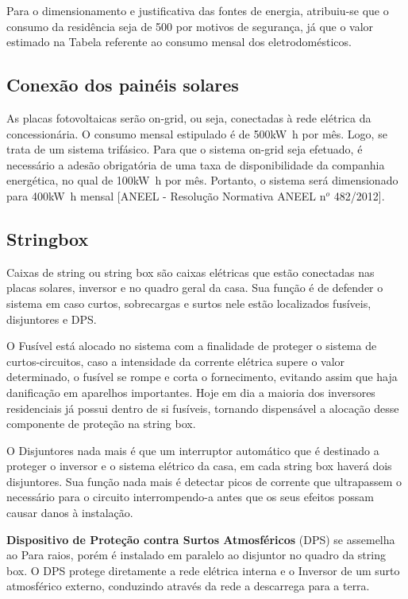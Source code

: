 	Para o dimensionamento e justificativa das fontes de energia, atribuiu-se que o consumo da residência seja de 500 por motivos de segurança, já que o valor estimado na Tabela referente ao consumo mensal dos eletrodomésticos.

\subsection{Conexão dos painéis solares}

	As placas fotovoltaicas serão on-grid, ou seja, conectadas à rede elétrica da concessionária. O consumo mensal estipulado é de 500\si{\kilo\watt\hour} por mês. Logo, se trata de um sistema trifásico. Para que o sistema on-grid seja efetuado, é necessário a adesão obrigatória de uma taxa de disponibilidade da companhia energética, no qual de 100\si{\kilo\watt\hour} por mês. Portanto, o sistema será dimensionado para 400\si{\kilo\watt\hour} mensal [ANEEL -  Resolução Normativa ANEEL n$^o$ 482/2012].

\subsection{Stringbox}
	
	Caixas de string ou string box são caixas elétricas que estão conectadas nas placas solares, inversor e no quadro geral da casa. Sua função é de defender o sistema em caso curtos, sobrecargas e surtos nele estão localizados fusíveis, disjuntores e DPS.

	O Fusível está alocado no sistema com a finalidade de proteger o sistema de curtos-circuitos, caso a intensidade da corrente elétrica supere o valor determinado, o fusível se rompe e corta o fornecimento, evitando assim que haja danificação em aparelhos importantes. Hoje em dia a maioria dos inversores residenciais já possui dentro de si fusíveis, tornando dispensável a alocação desse componente de proteção na string box.

	O Disjuntores nada mais é que um interruptor automático que é destinado a proteger o inversor e o sistema elétrico da casa, em cada string box haverá dois disjuntores. Sua função nada mais é detectar picos de corrente que ultrapassem o necessário para o circuito interrompendo-a antes que os seus efeitos possam causar danos à instalação.
	
\textbf{Dispositivo de Proteção contra Surtos Atmosféricos} (DPS) se assemelha ao Para raios, porém é instalado em paralelo ao disjuntor no quadro da string box. O DPS protege diretamente a rede elétrica interna e o Inversor de um surto atmosférico externo, conduzindo através da rede a descarrega para a terra.

